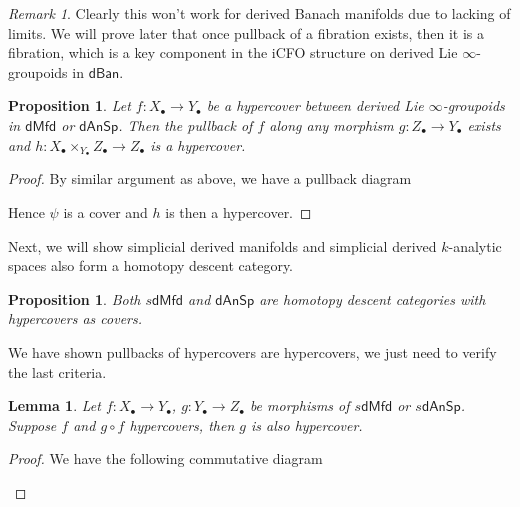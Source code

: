 \documentclass[12pt]{amsart}
\newtheorem{lem}[thm]{Lemma}
\newtheorem{prop}[thm]{Proposition}
\theoremstyle{definition}
\theoremstyle{remark}
\newtheorem{rem}[thm]{Remark}
\numberwithin{equation}{section}
\newcommand{\1}{{\mathbb{1}}}
\newcommand{\dmfd}{\mathsf{dMfd}}
\newcommand{\dan}{\mathsf{dAnSp}}
\newcommand{\dban}{\mathsf{dBan}}
\begin{document}
\begin{rem}
    Clearly this won't work for derived Banach manifolds due to lacking of limits. We will prove later that once pullback of a fibration exists, then it is a fibration, which is a key component in the iCFO structure on  derived Lie $\infty$-groupoids in $\dban$. 
\end{rem}
\begin{prop}\label{pb2}
	Let $f:X_{\bullet}\to Y_{\bullet}$ be a hypercover between derived Lie $\infty$-groupoids in $\dmfd$ or $\dan$. Then the pullback of $f$ along any morphism 
	$g: Z_{\bullet}\to Y_{\bullet}$ exists and $h: X_{\bullet} \times_{Y_{\bullet}} Z_{\bullet} \to Z_{\bullet}$ is a hypercover.
\end{prop}
\begin{proof}
    By similar argument as above, we have a pullback diagram
\begin{center}
\end{center}
Hence $\psi$ is a cover and $h$ is then a hypercover.

\end{proof}

Next, we will show simplicial derived manifolds and simplicial derived $k$-analytic spaces also form a homotopy descent category.


\begin{prop}
Both $s\dmfd$ and $\dan$ are homotopy descent categories with hypercovers as covers.
\end{prop}
We have shown pullbacks of hypercovers are hypercovers, we just need to verify the last criteria.

\begin{lem}
Let $f: X_{\bullet}\to Y_{\bullet}$, $g: Y_{\bullet}\to Z_{\bullet}$ be morphisms of  $s\dmfd$ or $s\dan$. Suppose $f$ and $g\circ f $ hypercovers, then $g$  is also hypercover.
\end{lem}

\begin{proof}
We have the following commutative diagram
    \begin{center}
    \end{center}
    
\end{proof}
\end{document}
